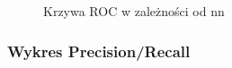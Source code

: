 \documentclass[12pt, a4paper]{article}
\begin{document}
\begin{figure}[H]
  \begin{center}
  \end{center}
  \caption{Krzywa ROC w zależności od nn}
  \label{fig:ubcf-nn-rmse}
\end{figure}

\subsubsection{Wykres Precision/Recall}
\end{document}
